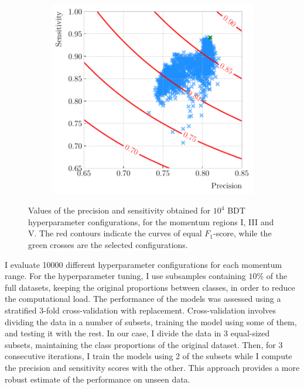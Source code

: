 \begin{figure}[t]
\begin{subfigure}{0.32\textwidth}
	\end{subfigure}
	\begin{subfigure}{0.32\textwidth}
		\centering
		\includegraphics[width=.99\linewidth]{Images/GArSoft_PID/BDT/precision_vs_sensitivity_p0_6.50_sigmap_3.50.pdf}
	\end{subfigure}
	\caption[Values of the precision and sensitivity obtained for $10^{4}$ BDT hyperparameter configurations, for the momentum regions I, III and V.]{Values of the precision and sensitivity obtained for $10^{4}$ BDT hyperparameter configurations, for the momentum regions I, III and V. The red contours indicate the curves of equal $F_{1}$-score, while the green crosses are the selected configurations.}
	\label{fig:hyper_precision_sensitivity}
\end{figure}

I evaluate 10000 different hyperparameter configurations for each momentum range. For the hyperparameter tuning, I use subsamples containing $10\%$ of the full datasets, keeping the original proportions between classes, in order to reduce the computational load. The performance of the models was assessed using a stratified 3-fold cross-validation with replacement. Cross-validation involves dividing the data in a number of subsets, training the model using some of them, and testing it with the rest. In our case, I divide the data in 3 equal-sized subsets, maintaining the class proportions of the original dataset. Then, for 3 consecutive iterations, I train the models using 2 of the subsets while I compute the precision and sensitivity scores with the other. This approach provides a more robust estimate of the performance on unseen data.

